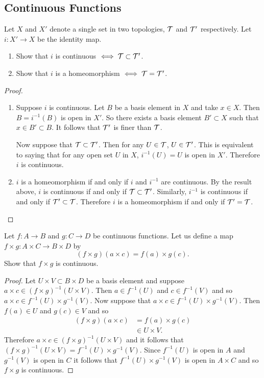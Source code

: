\subsection{Continuous Functions}
\begin{ex}{18.3}
    Let $X$ and $X'$ denote a single set in two topologies, $\mathcal{T}$ and $\mathcal{T}'$ respectively.
    Let $i:X'\to X$ be the identity map.
    \begin{enumerate}
        \item Show that $i$ is continuous $\iff\mathcal{T}\subset\mathcal{T}'$.
        \item Show that $i$ is a homeomorphism $\iff\mathcal{T}=\mathcal{T}'$.
    \end{enumerate}    
\end{ex}
\begin{proof}
    ${}$
    \begin{enumerate}
        \item Suppose $i$ is continuous. Let $B$ be a basis element in $X$ and take $x\in X$. 
            Then $B=i^{-1}(B)$ is open in $X'$. So there exists a basis element $B'\subset X$ such that $x\in B'\subset B$.
            It follows that $\mathcal{T}'$ is finer than $\mathcal{T}$.

            Now suppose that $\mathcal{T}\subset\mathcal{T}'$. Then for any $U\in\mathcal{T}$, $U\in\mathcal{T}'$. 
            This is equivalent to saying that for any open set $U$ in $X$, $i^{-1}(U)=U$ is open in $X'$.
            Therefore $i$ is continuous.
        \item $i$ is a homeomorphism if and only if $i$ and $i^{-1}$ are continuous.
            By the result above, $i$ is continuous if and only if $\mathcal{T}\subset\mathcal{T}'$. 
            Similarly, $i^{-1}$ is continuous if and only if $\mathcal{T}'\subset\mathcal{T}$. 
            Therefore $i$ is a homeomorphism if and only if $\mathcal{T}'=\mathcal{T}$.
    \end{enumerate}
\end{proof}

\begin{ex}{18.10}
    Let $f:A\to B$ and $g:C\to D$ be continuous functions. 
    Let us define a map $f\times g:A\times C\to B\times D$ by
    $$(f\times g)(a\times c)=f(a)\times g(c).$$
    Show that $f\times g$ is continuous.
\end{ex}
\begin{proof}
    Let $U\times V\subset B\times D$ be a basis element and suppose $a\times c\in(f\times g)^{-1}(U\times V)$.
    Then $a\in f^{-1}(U)$ and $c\in f^{-1}(V)$ and so $a\times c\in f^{-1}(U)\times g^{-1}(V)$.
    Now suppose that $a\times c\in f^{-1}(U)\times g^{-1}(V)$. Then $f(a)\in U$ and $g(c)\in V$ and so
    \begin{align*}
        (f\times g)(a\times c)&=f(a)\times g(c)\\
        &\in U\times V.
    \end{align*}
    Therefore $a\times c\in(f\times g)^{-1}(U\times V)$ and it follows that $(f\times g)^{-1}(U\times V)=f^{-1}(U)\times g^{-1}(V)$.
    Since $f^{-1}(U)$ is open in $A$ and $g^{-1}(V)$ is open in $C$ it follows that $f^{-1}(U)\times g^{-1}(V)$ is open in $A\times C$ and so $f\times g$ is continuous.
\end{proof}


